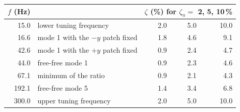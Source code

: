 \begin{tabular}{rlrrr}
\toprule
$f$ (Hz) & & \multicolumn{3}{c}{$\zeta$ (\%) for $\zeta_n=$ 2, 5, 10\,\%} \\
\midrule
15.0 & lower tuning frequency & 2.0 & 5.0 & 10.0 \\
16.6 & mode 1 with the $-y$ patch fixed & 1.8 & 4.6 & 9.1 \\
42.6 & mode 1 with the $+y$ patch fixed & 0.9 & 2.4 & 4.7 \\
44.0 & free-free mode 1 & 0.9 & 2.3 & 4.6 \\
67.1 & minimum of the ratio & 0.9 & 2.1 & 4.3 \\
192.1 & free-free mode 5 & 1.4 & 3.4 & 6.8 \\
300.0 & upper tuning frequency & 2.0 & 5.0 & 10.0 \\
\bottomrule
\end{tabular}
